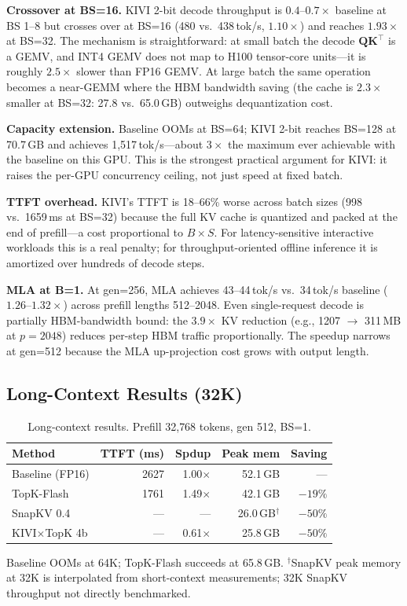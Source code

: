 \documentclass[conference]{IEEEtran}
\begin{document}
\textbf{Crossover at BS=16.}  KIVI 2-bit decode throughput is
$0.4$--$0.7\times$ baseline at BS 1--8 but crosses over at BS=16
(480 vs.\ 438\,tok/s, $1.10\times$) and reaches $1.93\times$ at BS=32.
The mechanism is straightforward: at small batch the decode
$\mathbf{Q}\mathbf{K}^\top$ is a GEMV, and INT4 GEMV does not map to
H100 tensor-core units---it is roughly $2.5\times$ slower than FP16
GEMV.  At large batch the same operation becomes a near-GEMM where the
HBM bandwidth saving (the cache is $2.3\times$ smaller at BS=32:
27.8 vs.\ 65.0\,GB) outweighs dequantization cost.

\textbf{Capacity extension.}  Baseline OOMs at BS=64; KIVI 2-bit
reaches BS=128 at 70.7\,GB and achieves 1{,}517\,tok/s---about
$3\times$ the maximum ever achievable with the baseline on this GPU.
This is the strongest practical argument for KIVI: it raises the
per-GPU concurrency ceiling, not just speed at fixed batch.

\textbf{TTFT overhead.}  KIVI's TTFT is 18--66\% worse across batch
sizes (998 vs.\ 1659\,ms at BS=32) because the full KV cache is
quantized and packed at the end of prefill---a cost proportional to
$B \times S$.  For latency-sensitive interactive workloads this is a
real penalty; for throughput-oriented offline inference it is amortized
over hundreds of decode steps.

\textbf{MLA at B=1.}  At gen=256, MLA achieves 43--44\,tok/s vs.\
34\,tok/s baseline ($1.26$--$1.32\times$) across prefill lengths
512--2048.  Even single-request decode is partially HBM-bandwidth
bound: the $3.9\times$ KV reduction (e.g., 1207 \(\rightarrow\) 311\,MB
at $p\!=\!2048$) reduces per-step HBM traffic proportionally.  The
speedup narrows at gen=512 because the MLA up-projection cost grows
with output length.

\subsection{Long-Context Results (32K)}

\begin{table}[!t]
\centering
\caption{Long-context results.  Prefill 32{,}768 tokens, gen 512, BS=1.}
\label{tab:longctx}
\begin{tabular}{@{}lrrrr@{}}
\toprule
\textbf{Method} & \textbf{TTFT (ms)} & \textbf{Spdup} & \textbf{Peak mem} & \textbf{Saving} \\
\midrule
Baseline (FP16)     & 2627 & 1.00$\times$ & 52.1\,GB & --- \\
TopK-Flash          & 1761 & 1.49$\times$ & 42.1\,GB & $-19\%$ \\
SnapKV 0.4          &  --- & ---          & 26.0\,GB$^{\dagger}$ & $-50\%$ \\
KIVI$\times$TopK 4b &  --- & 0.61$\times$ & 25.8\,GB & $-50\%$ \\
\bottomrule
\end{tabular}
\vspace{1pt}
\footnotesize{Baseline OOMs at 64K; TopK-Flash succeeds at 65.8\,GB.
$^{\dagger}$SnapKV peak memory at 32K is interpolated from
short-context measurements; 32K SnapKV throughput not directly
benchmarked.}
\end{table}
\end{document}
